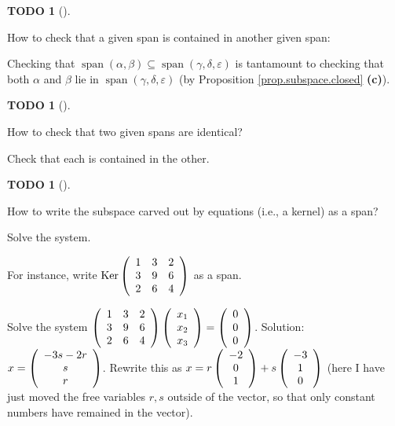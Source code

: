 \documentclass[numbers=enddot,12pt,final,onecolumn,notitlepage]{scrartcl}%
\theoremstyle{definition}
\newtheorem{quest}[theo]{TODO}
\newenvironment{todo}[1][]
{\begin{quest}[#1]\begin{leftbar}}
{\end{leftbar}\end{quest}}
\begin{document}
\begin{todo}
How to check that a given span is contained in another given span:

Checking that $\operatorname{span}\left(  \alpha,\beta\right)  \subseteq
\operatorname{span}\left(  \gamma,\delta,\varepsilon\right)  $ is tantamount
to checking that both $\alpha$ and $\beta$ lie in $\operatorname{span}\left(
\gamma,\delta,\varepsilon\right)  $ (by Proposition \ref{prop.subspace.closed}
\textbf{(c)}).
\end{todo}

\begin{todo}
How to check that two given spans are identical?

Check that each is contained in the other.
\end{todo}

\begin{todo}
How to write the subspace carved out by equations (i.e., a kernel) as a span?

Solve the system.

For instance, write $\operatorname*{Ker}\left(
\begin{array}
[c]{ccc}%
1 & 3 & 2\\
3 & 9 & 6\\
2 & 6 & 4
\end{array}
\right)  $ as a span.

Solve the system $\left(
\begin{array}
[c]{ccc}%
1 & 3 & 2\\
3 & 9 & 6\\
2 & 6 & 4
\end{array}
\right)  \left(
\begin{array}
[c]{c}%
x_{1}\\
x_{2}\\
x_{3}%
\end{array}
\right)  =\left(
\begin{array}
[c]{c}%
0\\
0\\
0
\end{array}
\right)  $. Solution: $x=\left(
\begin{array}
[c]{c}%
-3s-2r\\
s\\
r
\end{array}
\right)  $. Rewrite this as $x=r\left(
\begin{array}
[c]{c}%
-2\\
0\\
1
\end{array}
\right)  +s\left(
\begin{array}
[c]{c}%
-3\\
1\\
0
\end{array}
\right)  $ (here I have just moved the free variables $r,s$ outside of the
vector, so that only constant numbers have remained in the vector).


\end{todo}
\end{document}
